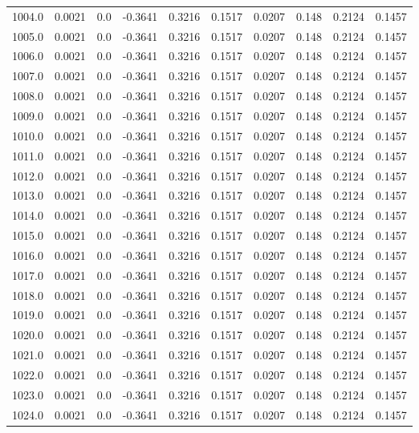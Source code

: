 \begin{longtable}{lrrrrrrrrr}
1004.0 & 0.0021 & 0.0 & -0.3641 & 0.3216 & 0.1517 & 0.0207 & 0.148 & 0.2124 & 0.1457 \\
1005.0 & 0.0021 & 0.0 & -0.3641 & 0.3216 & 0.1517 & 0.0207 & 0.148 & 0.2124 & 0.1457 \\
1006.0 & 0.0021 & 0.0 & -0.3641 & 0.3216 & 0.1517 & 0.0207 & 0.148 & 0.2124 & 0.1457 \\
1007.0 & 0.0021 & 0.0 & -0.3641 & 0.3216 & 0.1517 & 0.0207 & 0.148 & 0.2124 & 0.1457 \\
1008.0 & 0.0021 & 0.0 & -0.3641 & 0.3216 & 0.1517 & 0.0207 & 0.148 & 0.2124 & 0.1457 \\
1009.0 & 0.0021 & 0.0 & -0.3641 & 0.3216 & 0.1517 & 0.0207 & 0.148 & 0.2124 & 0.1457 \\
1010.0 & 0.0021 & 0.0 & -0.3641 & 0.3216 & 0.1517 & 0.0207 & 0.148 & 0.2124 & 0.1457 \\
1011.0 & 0.0021 & 0.0 & -0.3641 & 0.3216 & 0.1517 & 0.0207 & 0.148 & 0.2124 & 0.1457 \\
1012.0 & 0.0021 & 0.0 & -0.3641 & 0.3216 & 0.1517 & 0.0207 & 0.148 & 0.2124 & 0.1457 \\
1013.0 & 0.0021 & 0.0 & -0.3641 & 0.3216 & 0.1517 & 0.0207 & 0.148 & 0.2124 & 0.1457 \\
1014.0 & 0.0021 & 0.0 & -0.3641 & 0.3216 & 0.1517 & 0.0207 & 0.148 & 0.2124 & 0.1457 \\
1015.0 & 0.0021 & 0.0 & -0.3641 & 0.3216 & 0.1517 & 0.0207 & 0.148 & 0.2124 & 0.1457 \\
1016.0 & 0.0021 & 0.0 & -0.3641 & 0.3216 & 0.1517 & 0.0207 & 0.148 & 0.2124 & 0.1457 \\
1017.0 & 0.0021 & 0.0 & -0.3641 & 0.3216 & 0.1517 & 0.0207 & 0.148 & 0.2124 & 0.1457 \\
1018.0 & 0.0021 & 0.0 & -0.3641 & 0.3216 & 0.1517 & 0.0207 & 0.148 & 0.2124 & 0.1457 \\
1019.0 & 0.0021 & 0.0 & -0.3641 & 0.3216 & 0.1517 & 0.0207 & 0.148 & 0.2124 & 0.1457 \\
1020.0 & 0.0021 & 0.0 & -0.3641 & 0.3216 & 0.1517 & 0.0207 & 0.148 & 0.2124 & 0.1457 \\
1021.0 & 0.0021 & 0.0 & -0.3641 & 0.3216 & 0.1517 & 0.0207 & 0.148 & 0.2124 & 0.1457 \\
1022.0 & 0.0021 & 0.0 & -0.3641 & 0.3216 & 0.1517 & 0.0207 & 0.148 & 0.2124 & 0.1457 \\
1023.0 & 0.0021 & 0.0 & -0.3641 & 0.3216 & 0.1517 & 0.0207 & 0.148 & 0.2124 & 0.1457 \\
1024.0 & 0.0021 & 0.0 & -0.3641 & 0.3216 & 0.1517 & 0.0207 & 0.148 & 0.2124 & 0.1457 \\

\end{longtable}
